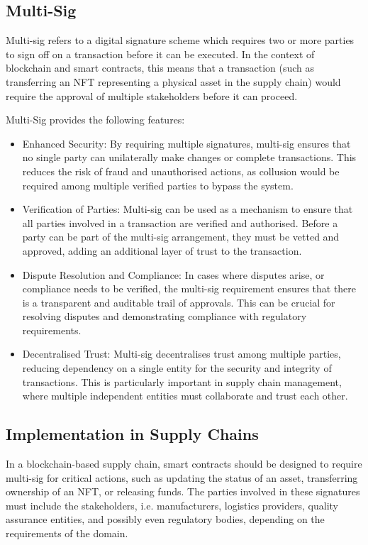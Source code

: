 \documentclass{tufte-handout}
\begin{document}
\subsection{Multi-Sig}\label{sec:page-layout}
Multi-sig refers to a digital signature scheme which requires two or more parties to sign off on a transaction before it can be executed.
In the context of blockchain and smart contracts, this means that a transaction (such as transferring an NFT representing a physical asset
in the supply chain) would require the approval of multiple stakeholders before it can proceed.

Multi-Sig provides the following features:
\begin{itemize}
    \item Enhanced Security: By requiring multiple signatures, multi-sig ensures that no single party can unilaterally make changes or complete
    transactions. This reduces the risk of fraud and unauthorised actions, as collusion would be required among multiple verified parties to
    bypass the system.
    \item Verification of Parties: Multi-sig can be used as a mechanism to ensure that all parties involved in a transaction are verified and
    authorised. Before a party can be part of the multi-sig arrangement, they must be vetted and approved, adding an additional layer of trust
    to the transaction.
    \item Dispute Resolution and Compliance: In cases where disputes arise, or compliance needs to be verified, the multi-sig requirement
    ensures that there is a transparent and auditable trail of approvals. This can be crucial for resolving disputes and demonstrating
    compliance with regulatory requirements.
    \item Decentralised Trust: Multi-sig decentralises trust among multiple parties, reducing dependency on a single entity for the security
    and integrity of transactions. This is particularly important in supply chain management, where multiple independent entities must
    collaborate and trust each other.
\end{itemize}

\subsection{Implementation in Supply Chains}\label{sec:page-layout}

In a blockchain-based supply chain, smart contracts should be designed to require multi-sig for critical actions, such as updating the
status of an asset, transferring ownership of an NFT, or releasing funds. The parties involved in these signatures must include the stakeholders,
i.e. manufacturers, logistics providers, quality assurance entities, and possibly even regulatory bodies, depending on the requirements of the domain.
\end{document}
